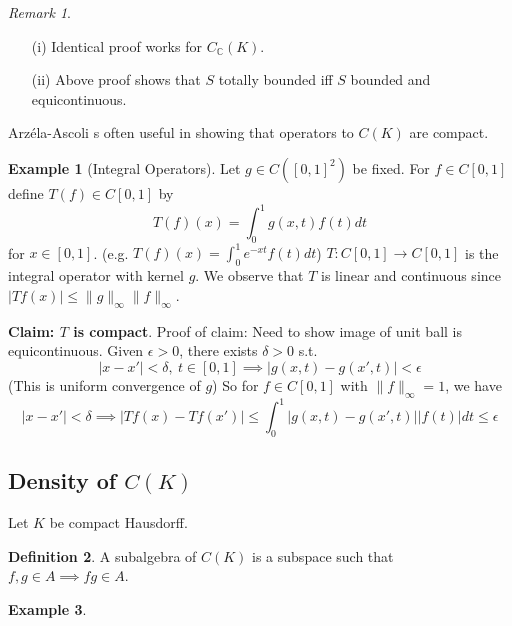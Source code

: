 \documentclass{article}
\theoremstyle{definition}
\newtheorem{defn}{Definition}[section]
\newtheorem{example}[defn]{Example}
\theoremstyle{remark}
\newtheorem{rem}{Remark}
\theoremstyle{plain}
\newcommand{\CC}{\mathbb{C}}
\begin{document}
\begin{rem}
    \begin{itemize}
        \item[(i)] Identical proof works for $C_\CC(K)$.
        \item[(ii)] Above proof shows that $S$ totally bounded iff $S$ bounded and equicontinuous.
    \end{itemize}
\end{rem}
Arz\'ela-Ascoli s often useful in showing that operators to $C(K)$ are compact.
\begin{example}[Integral Operators]
    Let $g\in C([0,1]^2)$ be fixed. For $f\in C[0,1]$ define $T(f)\in C[0,1]$ by
    \[T(f)(x)=\int_0^1g(x,t)f(t)dt\]
    for $x\in[0,1]$. (e.g. $T(f)(x)=\int_0^1e^{-xt}f(t)dt$)
    $T:C[0,1]\to C[0,1]$ is the integral operator with kernel $g$. We observe that $T$ is linear and continuous since $|Tf(x)|\le\|g\|_\infty\|f\|_\infty$.

    \textbf{Claim: $T$ is compact}.
    Proof of claim: Need to show image of unit ball is equicontinuous. Given $\epsilon>0$, there exists $\delta>0$ s.t. 
    \[|x-x'|<\delta,\ t\in[0,1]\implies |g(x,t)-g(x',t)|<\epsilon\]
    (This is uniform convergence of $g$)
    So for $f\in C[0,1]$ with $\|f\|_\infty=1$, we have
    \[|x-x'|<\delta\implies |Tf(x)-Tf(x')|\le\int_0^1|g(x,t)-g(x',t)||f(t)|dt\le\epsilon\]
\end{example}

\subsection{Density of $C(K)$}
Let $K$ be compact Hausdorff.
\begin{defn}
    A subalgebra of $C(K)$ is a subspace such that $f,g\in A\implies fg\in A$.
\end{defn}
\begin{example}
    
\end{example}
\end{document}
